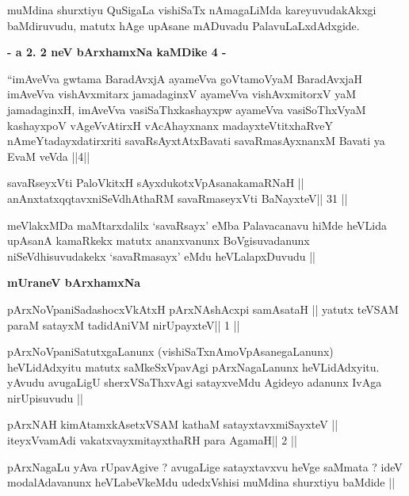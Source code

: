 \begin{artha}
muMdina shurxtiyu QuSigaLa vishiSaTx nAmagaLiMda kareyuvudakAkxgi
baMdiruvudu, matutx hAge upAsane mADuvadu PalavuLaLxdAdxgide.
\end{artha}

\medskip
{\centerline{\textbf{- a 2. 2 neV bArxhamxNa kaMDike 4 -}}}

\begin{artha}
``imAveVva gwtama BaradAvxjA ayameVva goVtamoV\s yaM BaradAvxjaH
  imAveVva vishAvxmitarx jamadaginxV ayameVva vishAvxmitorxV\s
  yaM jamadaginxH, imAveVva vasiSaThxkashayxpw ayameVva vasiSoThxV\s yaM
  kashayxpoV vAgeVvAtirxH vAcAhayxnanx madayxteV\s titxhaRveY
  nAmeYtadayxdatirxriti savaRsAyxtAtxBavati savaRmasAyxnanxM Bavati
  ya EvaM veVda ||4||
\end{artha}

\begin{shl}
savaRseyxVti PaloVkitxH sAyxdukotxVpAsanakamaRNaH ||
anAnxtatxqqtavxniSeVdhAthaRM savaRmaseyxVti BaNayxteV\hfill || 31 ||
\end{shl}

\begin{artha}
meVlakxMDa maMtarxdalilx `savaRsayx' eMba Palavacanavu hiMde heVLida
upAsanA kamaRkekx matutx ananxvanunx BoVgisuvadanunx niSeVdhisuvudakekx
`savaRmasayx' eMdu heVLalapxDuvudu || 
\end{artha}

\medskip
{\centerline{\textbf{mUraneV bArxhamxNa}}}

\begin{shl}
pArxNoVpaniSadashocxVkAtxH pArxNAshAcxpi samAsataH ||
yatutx teVSAM paraM satayxM tadidAniVM nirUpayxteV\hfill || 1 ||
\end{shl}

\begin{artha}
pArxNoVpaniSatutxgaLanunx (vishiSaTxnAmoVpAsanegaLanunx) heVLidAdxyitu
matutx saMkeSxVpavAgi pArxNagaLanunx heVLidAdxyitu. yAvudu avugaLigU
sherxVSaThxvAgi satayxveMdu Agideyo adanunx IvAga nirUpisuvudu ||
\end{artha}

\begin{shl}
pArxNAH kimAtamxkAsetxVSAM kathaM satayxtavxmiSayxteV ||
iteyxVvamAdi vakatxvayxmitayxthaRH para AgamaH\hfill || 2 ||
\end{shl}

\begin{artha}
pArxNagaLu yAva rUpavAgive ? avugaLige satayxtavxvu heVge saMmata ? ideV
modalAdavanunx heVLabeVkeMdu udedxVshisi muMdina shurxtiyu baMdide ||
\end{artha}

